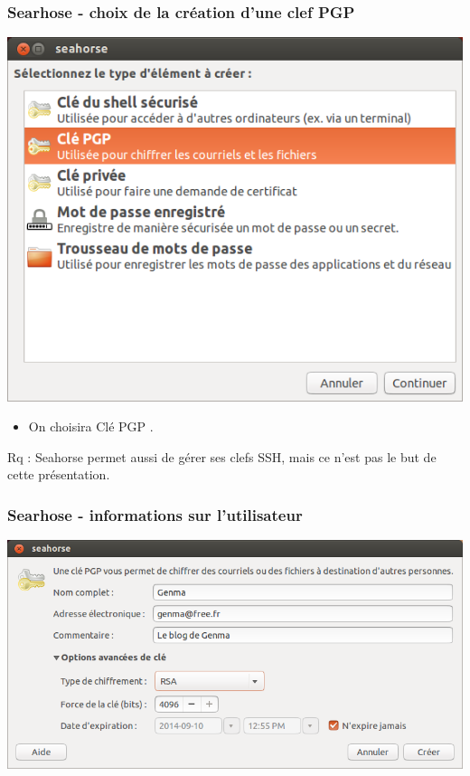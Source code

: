 \documentclass{beamer}
\begin{document}
\begin{frame}
\frametitle{Searhose - choix de la création d'une clef PGP}
\begin{center}
\includegraphics[scale=0.3] {./images/Seahorse02_creationclef.png}
\end{center}
\begin{itemize}
\item On choisira Clé PGP	.
\end{itemize}
Rq : Seahorse permet aussi de gérer ses clefs SSH, mais ce n'est pas le but de cette présentation.
\end{frame}

\begin{frame}
\frametitle{Searhose - informations sur l'utilisateur}
\begin{center}
\includegraphics[scale=0.4] {./images/Seahorse03_creationclef.png}
\end{center}
\begin{itemize}
\end{itemize}	
\end{frame}
\end{document}
